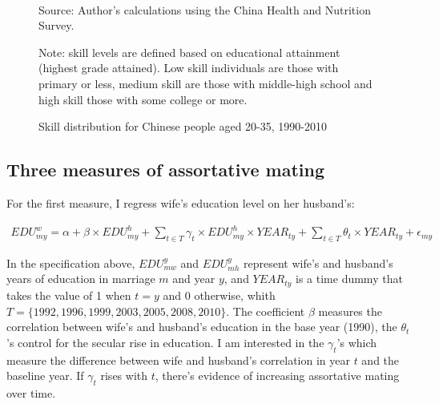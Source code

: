 \documentclass[12pt]{article}
\newcommand{\source}[1]{\caption*{Source: {#1}} }
\newcommand{\note}[1]{\caption*{Note: {#1}} }
\begin{document}
\begin{figure}[hp]
	\centering
	\caption{Skill distribution for Chinese people aged 20-35, 1990-2010}\label{fig:skill_premium}
	\\
	\source{Author's calculations using the China Health and Nutrition Survey.}
	\note{skill levels are defined based on educational attainment (highest grade attained). Low skill individuals are those with primary or less, medium skill are those with middle-high school and high skill those with some college or more.}
\end{figure}


\subsection*{Three measures of assortative mating}

For the first measure, I regress wife's education level on her husband's:

\begin{align*}
EDU_{my}^w = \alpha + \beta\times EDU_{my}^h+\sum_{t\in T} \gamma_t\times EDU_{my}^h\times YEAR_{ty}+\sum_{t\in T}\theta_t\times YEAR_{ty}+\epsilon_{my}
\end{align*}

In the specification above, $EDU_{mw}^y$ and $EDU_{mh}^y$ represent wife's and husband's years of education in marriage $m$ and year $y$, and $YEAR_{ty}$ is a time dummy that takes the value of 1 when $t=y$ and 0 otherwise, whith $T = \{1992,1996,1999,2003,2005,2008,2010\}$. The coefficient $\beta$ measures the correlation between wife's and husband's education in the base year (1990), the $\theta_t$'s control for the secular rise in education. I am interested in the $\gamma_t$'s which measure the difference between wife and husband's correlation in year $t$ and the baseline year. If $\gamma_t$ rises with $t$, there's evidence of increasing assortative mating over time.
\end{document}
